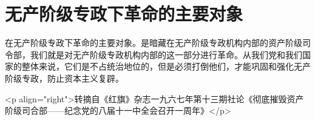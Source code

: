 \section[无产阶级专政下革命的主要对象（一九六七年八月）]{无产阶级专政下革命的主要对象}


在无产阶级专政下革命的主要对象。是暗藏在无产阶级专政机构内部的资产阶级司令部，我们就是对无产阶级专政机构内部的这一部分进行革命。从我们党和我们国家的整体来说，它们是不占统治地位的，但是必须打倒他们，才能巩固和强化无产阶级专政，防止资本主义复辟。

<p align="right">转摘自《红旗》杂志一九六七年第十三期社论《彻底摧毁资产阶级司合部——纪念党的八届十一中全会召开一周年》</p>


